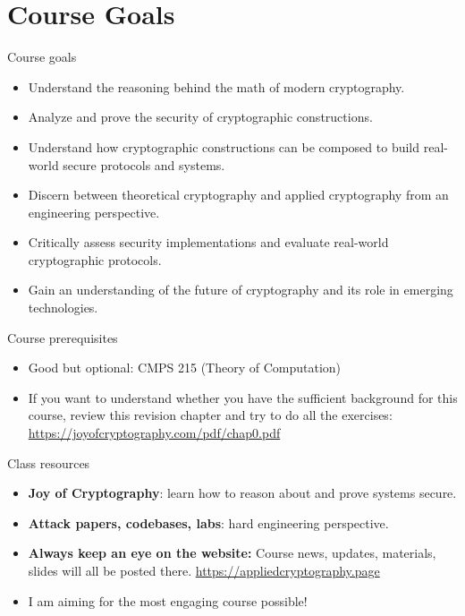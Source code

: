 \documentclass[aspectratio=169, lualatex, handout]{beamer}
\begin{document}
\section{Course Goals}

\begin{frame}{Course goals}
	\begin{itemize}[<+->]
		\item Understand the reasoning behind the math of modern cryptography.
		\item Analyze and prove the security of cryptographic constructions.
		\item Understand how cryptographic constructions can be composed to build real-world
		      secure protocols and systems.
		\item Discern between theoretical cryptography and applied cryptography from
		      an engineering perspective.
		\item Critically assess security implementations and evaluate real-world cryptographic
		      protocols.
		\item Gain an understanding of the future of cryptography and its role in emerging
		      technologies.
	\end{itemize}
\end{frame}

\begin{frame}{Course prerequisites}
	\begin{itemize}
		\item Good but optional: CMPS 215 (Theory of Computation)
		\item If you want to understand whether you have the sufficient background for this course, review this revision chapter and try to do all the exercises: \url{https://joyofcryptography.com/pdf/chap0.pdf}
	\end{itemize}
\end{frame}

\begin{frame}{Class resources}
	\begin{itemize}[<+->]
		\item \textbf{Joy of Cryptography}: learn how to reason about and prove systems secure.
		\item \textbf{Attack papers, codebases, labs}: hard engineering perspective.
		      \vspace{1cm}
		\item \textbf{Always keep an eye on the website:} Course news, updates,
		      materials, slides will all be posted there.
		      \url{https://appliedcryptography.page}
		\item I am aiming for the most engaging course possible!
	\end{itemize}
\end{frame}
\end{document}
